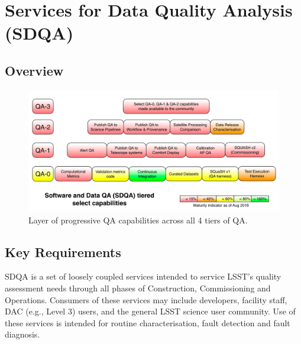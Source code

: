 \section{Services for Data Quality Analysis (SDQA)}
\label{sec:sdqa}

\subsection{Overview}

\begin{figure}
\centering
\includegraphics[width=\textwidth]{qa_services.png}
\caption{Layer of progressive QA capabilities across all 4 tiers of QA.
\label{fig:qa-overview}}
\end{figure}

\subsection{Key Requirements}

SDQA is a set of loosely coupled services intended to service LSST's quality assessment needs through all phases of Construction, Commissioning and Operations. Consumers of these services may include developers, facility staff, DAC (e.g., Level 3) users, and the general LSST science user community. Use of these services is intended for routine characterisation, fault detection and fault diagnosis.

